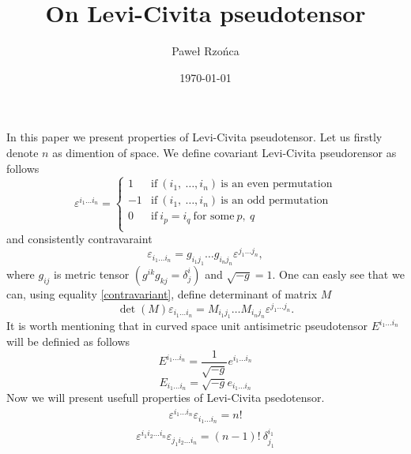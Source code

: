 \documentclass[a4paper; 11pt]{article}
\title{On Levi-Civita pseudotensor}
\author{Paweł Rzońca}
\date{\today}
\begin{document}
\maketitle
In this paper we present properties of Levi-Civita pseudotensor.
Let us firstly denote $n$ as dimention of space.
We define covariant Levi-Civita pseudorensor as follows
\begin{equation}
\varepsilon^{i_1\dots i_n} = 
\left\{ 
\begin{array}{cl}
1 & \text{if}\ (i_1,\ \dots, i_n)\ \text{is an even permutation}\\
-1 & \text{if}\ (i_1,\ \dots, i_n)\ \text{is an odd permutation}\\
0 & \text{if}\ i_p = i_q \ \text{for some}\ p,\ q \\
\end{array}
\right.
\end{equation}
and consistently contravaraint
\begin{equation}\label{contravariant}
\varepsilon_{i_1\dots i_n} = 
g_{i_1 j_1} \dots g_{i_n j_n} \varepsilon^{j_1\dots j_n} ,
\end{equation}
where $g_{ij}$ is metric tensor $(g^{ik} g_{kj} = \delta^i_j)$ and 
$\sqrt{-g}=1$. One can easly see that we can, 
using equality \eqref{contravariant}, define determinant of 
matrix $M$
\begin{equation}
\det ( M ) \varepsilon_{i_1\dots i_n} = 
M_{i_1 j_1} \dots M_{i_n j_n} \varepsilon^{j_1\dots j_n} .
\end{equation}
It is worth mentioning that in curved space unit antisimetric pseudotensor 
$E^{i_1\dots i_n}$ will be definied as follows
\begin{equation}
E^{i_1\dots i_n} = \frac{1}{\sqrt{-g}} e^{i_1\dots i_n}
\end{equation}
\begin{equation}
E_{i_1\dots i_n} =\sqrt{-g} e_{i_1\dots i_n}
\end{equation}
Now we will present usefull properties of Levi-Civita psedotensor.
\begin{align}
\varepsilon^{i_1\dots i_n}\varepsilon_{i_1\dots i_n} = n!
\end{align}
\begin{align}
\varepsilon^{i_1 i_2\dots i_n}\varepsilon_{j_1 i_2 \dots i_n} =
(n-1)!\ \delta^{i_1}_{j_1} 
\end{align}
\end{document}

